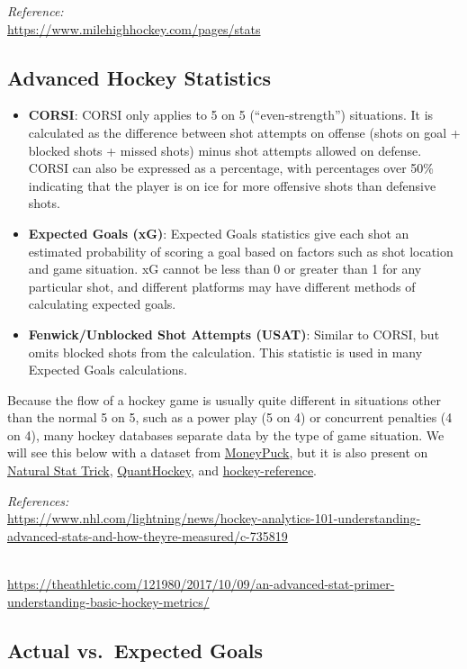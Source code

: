 \documentclass[
  11pt,
]{book}
\theoremstyle{definition}
\theoremstyle{definition}
\theoremstyle{definition}
\theoremstyle{definition}
\theoremstyle{remark}
\begin{document}
\emph{Reference:}\\
\url{https://www.milehighhockey.com/pages/stats}

\hypertarget{advanced-hockey-statistics}{%
\subsection{Advanced Hockey Statistics}\label{advanced-hockey-statistics}}

\begin{itemize}
\item
  \textbf{CORSI}: CORSI only applies to 5 on 5 (``even-strength'') situations. It is calculated as the difference between shot attempts on offense (shots on goal + blocked shots + missed shots) minus shot attempts allowed on defense. CORSI can also be expressed as a percentage, with percentages over 50\% indicating that the player is on ice for more offensive shots than defensive shots.
\item
  \textbf{Expected Goals (xG)}: Expected Goals statistics give each shot an estimated probability of scoring a goal based on factors such as shot location and game situation. xG cannot be less than 0 or greater than 1 for any particular shot, and different platforms may have different methods of calculating expected goals.
\item
  \textbf{Fenwick/Unblocked Shot Attempts (USAT)}: Similar to CORSI, but omits blocked shots from the calculation. This statistic is used in many Expected Goals calculations.
\end{itemize}

Because the flow of a hockey game is usually quite different in situations other than the normal 5 on 5, such as a power play (5 on 4) or concurrent penalties (4 on 4), many hockey databases separate data by the type of game situation. We will see this below with a dataset from \href{www.moneypuck.com}{MoneyPuck}, but it is also present on \href{https://www.naturalstattrick.com/}{Natural Stat Trick}, \href{www.quanthockey.com}{QuantHockey}, and \href{www.hockey-reference.com}{hockey-reference}.

\emph{References:}\\
\url{https://www.nhl.com/lightning/news/hockey-analytics-101-understanding-advanced-stats-and-how-theyre-measured/c-735819}\strut \\
\url{https://theathletic.com/121980/2017/10/09/an-advanced-stat-primer-understanding-basic-hockey-metrics/}

\hypertarget{actual-vs.-expected-goals}{%
\subsection{Actual vs.~Expected Goals}\label{actual-vs.-expected-goals}}
\end{document}
